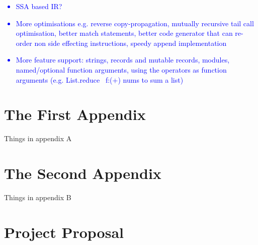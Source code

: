 \documentclass[12pt,twoside,notitlepage]{report}
\newcommand\note[1]{\textcolor{blue}{#1}}
\begin{document}
\note{
	\begin{itemize}
		\item SSA based IR?
		\item More optimisations e.g. reverse copy-propagation, mutually recursive tail call optimisation, better match statements, better code generator that can re-order non side effecting instructions, speedy append implementation
		\item More feature support: strings, records and mutable records, modules, named/optional function arguments, using the operators as function arguments (e.g. List.reduce ~f:(+) nums to sum a list)
	\end{itemize}
}





\clearpage


\printbibliography[title={Bibliography}]
\clearpage

\appendix

\chapter{The First Appendix}

Things in appendix A


\clearpage

\chapter{The Second Appendix}

Things in appendix B


\clearpage

\chapter{Project Proposal}
\clearpage


\end{document}
